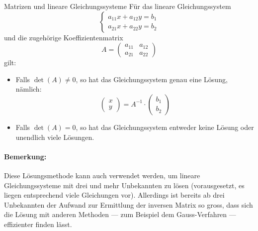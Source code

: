 \begin{bsp}


\end{bsp}
\clearpage
\begin{satz}
    {Matrizen und lineare Gleichungssysteme}{}
    Für das lineare Gleichungssystem
\[
\begin{cases}
a_{11}x + a_{12}y = b_1 \\
a_{21}x + a_{22}y = b_2
\end{cases}
\]
und die zugehörige Koeffizientenmatrix
\[
A = \begin{pmatrix}
a_{11} & a_{12} \\
a_{21} & a_{22}
\end{pmatrix}
\]
gilt:

\begin{itemize}
  \item Falls \( \det(A) \neq 0 \), so hat das Gleichungssystem genau eine Lösung, nämlich:
  \[
  \begin{pmatrix}
  x \\
  y
  \end{pmatrix}
  = A^{-1} \cdot
  \begin{pmatrix}
  b_1 \\
  b_2
  \end{pmatrix}
  \]
  
  \item Falls \( \det(A) = 0 \), so hat das Gleichungssystem entweder keine Lösung oder unendlich viele Lösungen.
\end{itemize}
\end{satz}
\paragraph{Bemerkung:}
Diese Lösungsmethode kann auch verwendet werden, um lineare Gleichungssysteme mit drei und mehr Unbekannten zu lösen (vorausgesetzt, es liegen entsprechend viele Gleichungen vor). 
Allerdings ist bereits ab drei Unbekannten der Aufwand zur Ermittlung der inversen Matrix so gross, dass sich die Lösung mit anderen Methoden — zum Beispiel dem Gauss-Verfahren — effizienter finden lässt.

